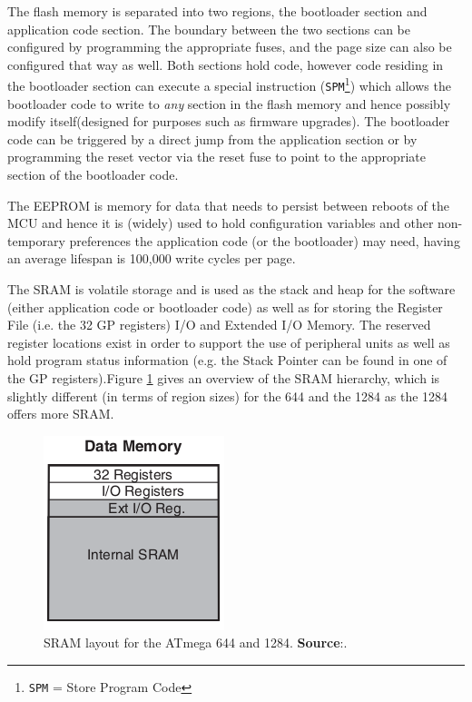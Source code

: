 \documentclass[10pt,a4paper,twocolumn]{article}
\begin{document}
	The flash memory is separated into two regions, the bootloader section and application code section. The boundary between the two sections can be configured by programming the appropriate fuses, and the page size can also be configured that way as well. Both sections hold code, however code residing in the bootloader section can execute a special instruction (\texttt{SPM}\footnote{\texttt{SPM} = Store Program Code}) which allows the bootloader code to write to \textit{any} section in the flash memory and hence possibly modify itself(designed for purposes such as firmware upgrades). The bootloader code can be triggered by a direct jump from the application section or by programming the reset vector via the reset fuse to point to the appropriate section of the bootloader code. 
	
	The EEPROM is memory for data that needs to persist between reboots of the MCU and hence it is (widely) used to hold configuration variables and other non-temporary preferences the application code (or the bootloader) may need, having an average lifespan is 100,000 write cycles per page. 
	
	The SRAM is volatile storage and is used as the stack and heap for the software (either application code or bootloader code) as well as for storing the Register File (i.e. the 32 GP registers) I/O and Extended I/O Memory. The reserved register locations exist in order to support the use of peripheral units as well as hold program status information (e.g. the Stack Pointer can be found in one of the GP registers).Figure \ref{fig:stack} gives an overview of the SRAM hierarchy, which is slightly different (in terms of region sizes) for the 644 and the 1284 as the 1284 offers more SRAM.
	
	\begin{figure}
		\includegraphics[scale=0.7]{img/stack.png}
		\caption{SRAM layout for the ATmega 644 and 1284. \textbf{Source}:\protect\citep{atmega_manual}.}
		\label{fig:stack}		
	\end{figure}
	
\end{document}
